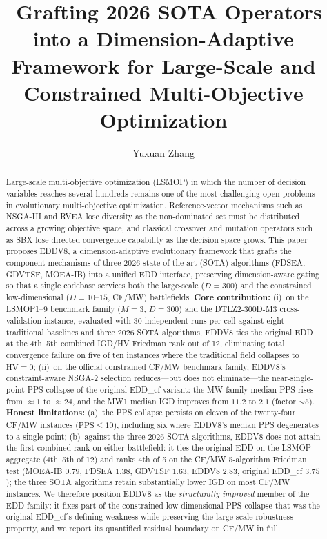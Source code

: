 \documentclass[preprint,12pt]{elsarticle}
\begin{document}
\begin{frontmatter}

\title{\ Grafting 2026 SOTA Operators into a
Dimension-Adaptive Framework for Large-Scale and Constrained
Multi-Objective Optimization}

\author[a]{Yuxuan Zhang}
\address[a]{Graduate School, Army Engineering University of
PLA, Nanjing, China}

\begin{abstract}
Large-scale multi-objective optimization (LSMOP) in which the number of
decision variables reaches several hundreds remains one of the most
challenging open problems in evolutionary multi-objective optimization.
Reference-vector mechanisms such as NSGA-III and RVEA lose diversity as
the non-dominated set must be distributed across a growing objective
space, and classical crossover and mutation operators such as SBX lose
directed convergence capability as the decision space grows. This paper
proposes EDDV8, a dimension-adaptive evolutionary framework that grafts
the component mechanisms of three 2026 state-of-the-art (SOTA)
algorithms (FDSEA, GDVTSF, MOEA-IB) into a unified EDD interface,
preserving dimension-aware gating so that a single codebase services
both the large-scale ($D=300$) and the constrained low-dimensional
($D=10$--$15$, CF/MW) battlefields. \textbf{Core contribution:}
(i)~on the LSMOP1--9 benchmark family ($M=3$, $D=300$) and the
DTLZ2-300D-M3 cross-validation instance, evaluated with 30 independent
runs per cell against eight traditional baselines and three 2026 SOTA
algorithms, EDDV8 ties the original EDD at the 4th--5th combined IGD/HV
Friedman rank out of 12, eliminating total convergence failure on five
of ten instances where the traditional field collapses to
$\mathrm{HV}=0$; (ii)~on the official constrained CF/MW benchmark
family, EDDV8's constraint-aware NSGA-2 selection reduces---but does not
eliminate---the near-single-point PPS collapse of the original EDD\_cf
variant: the MW-family median PPS rises from $\approx 1$ to
$\approx 24$, and the MW1 median IGD improves from $11.2$ to $2.1$
(factor $\sim$5). \textbf{Honest limitations:} (a)~the PPS collapse
persists on eleven of the twenty-four CF/MW instances
($\mathrm{PPS} \le 10$), including six where EDDV8's median PPS
degenerates to a single point; (b)~against the three 2026 SOTA
algorithms, EDDV8 does not attain the first combined rank on either
battlefield: it ties the original EDD on the LSMOP aggregate
(4th--5th of 12) and ranks 4th of 5 on the CF/MW 5-algorithm Friedman
test (MOEA-IB $0.79$, FDSEA $1.38$, GDVTSF $1.63$, EDDV8 $2.83$,
original EDD\_cf $3.75$); the three SOTA algorithms retain
substantially lower IGD on most CF/MW instances. We therefore position
EDDV8 as the \emph{structurally improved} member of the EDD family: it
fixes part of the constrained low-dimensional PPS collapse that was the
original EDD\_cf's defining weakness while preserving the large-scale
robustness property, and we report its quantified residual boundary on
CF/MW in full.
\end{abstract}


\end{frontmatter}
\end{document}
